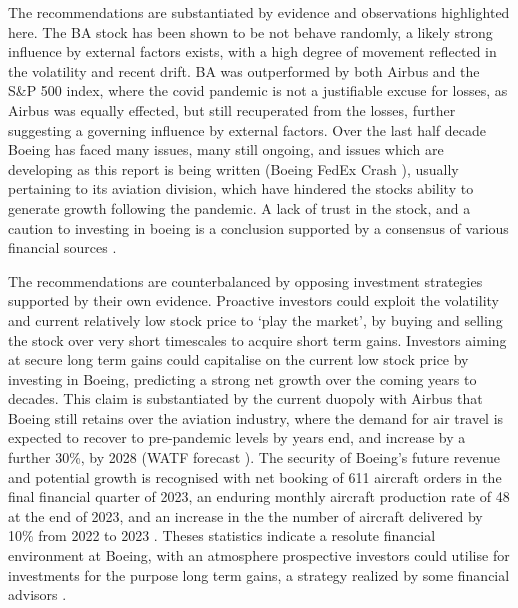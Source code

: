 \documentclass[
	a4paper, %
	11pt, %
	twoside, %
]{LTJournalArticle}
\begin{document}
\indent The recommendations are substantiated by evidence and observations highlighted here.
The BA stock has been shown to be not behave randomly, a likely strong influence by external factors exists, with a high degree of movement reflected in the volatility and recent drift.
BA was outperformed by both Airbus and the S\&P 500 index, where the covid pandemic is not a justifiable excuse for losses, as Airbus was equally effected, but still recuperated from the losses, further suggesting a governing influence by external factors.
Over the last half decade Boeing has faced many issues, many still ongoing, and issues which are developing as this report is being written (Boeing FedEx Crash \cite{Extra_issues}), usually pertaining to its aviation division, which have hindered the stocks ability to generate growth following the pandemic.
A lack of trust in the stock, and a caution to investing in boeing is a conclusion supported by a consensus of various financial sources \cite{Motley_2024,Forbes_2024}.

\indent The recommendations are counterbalanced by opposing investment strategies supported by their own evidence.
Proactive investors could exploit the volatility and current relatively low stock price to `play the market', by buying and selling the stock over very short timescales to acquire short term gains.
Investors aiming at secure long term gains could capitalise on the current low stock price by investing in Boeing, predicting a strong net growth over the coming years to decades.
This claim is substantiated by the current duopoly with Airbus that Boeing still retains over the aviation industry, where the demand for air travel is expected to recover to pre-pandemic levels by years end, and increase by a further 30\%, by 2028 (WATF forecast \cite{Air_future}).
The security of Boeing's future revenue and potential growth is recognised with net booking of 611 aircraft orders in the final financial quarter of 2023, an enduring monthly aircraft production rate of 48 at the end of 2023, and an increase in the the number of aircraft delivered by 10\% from 2022 to 2023 \cite{Airbus_report}.
Theses statistics indicate a resolute financial environment at Boeing, with an atmosphere prospective investors could utilise for investments for the purpose long term gains, a strategy realized by some financial advisors \cite{Forbes_2024}.

\end{document}
